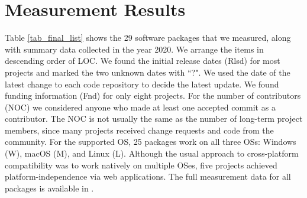 \documentclass[final, 3p, times, authoryear]{elsarticle}
\begin{document}
\section{Measurement Results} \label{ch_results}

Table \ref{tab_final_list} shows the 29 software packages that we measured,
along with summary data collected in the year 2020. We arrange the items in
descending order of LOC. We found the initial release dates (Rlsd) for most
projects and marked the two unknown dates with ``?". We used the date of the
latest change to each code repository to decide the latest update. We found
funding information (Fnd) for only eight projects.  For the number of
contributors (NOC) we considered anyone who made at least one accepted commit as
a contributor. The NOC is not usually the same as the number of long-term
project members, since many projects received change requests and code from the
community.  For the supported OS, 25 packages work on all three OSs: Windows
(W), macOS (M), and Linux (L). Although the usual approach to cross-platform
compatibility was to work natively on multiple OSes, five projects achieved
platform-independence via web applications. The full measurement data for all
packages is available in \citet{Dong2021-Data}.
\end{document}
